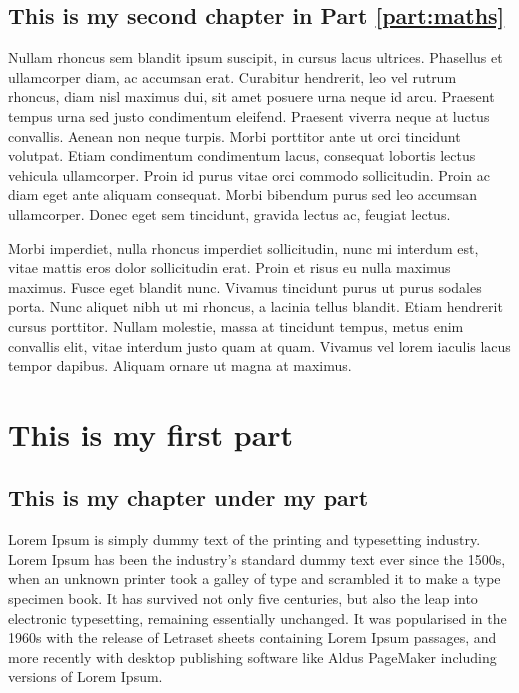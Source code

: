 \documentclass[oneside, a4paper]{book}
\begin{document}
\chapter{This is my second chapter in Part \ref{part:maths}}

 Nullam rhoncus sem blandit ipsum suscipit, in cursus lacus ultrices. Phasellus et ullamcorper diam, ac accumsan erat. Curabitur hendrerit, leo vel rutrum rhoncus, diam nisl maximus dui, sit amet posuere urna neque id arcu. Praesent tempus urna sed justo condimentum eleifend. Praesent viverra neque at luctus convallis. Aenean non neque turpis. Morbi porttitor ante ut orci tincidunt volutpat. Etiam condimentum condimentum lacus, consequat lobortis lectus vehicula ullamcorper. Proin id purus vitae orci commodo sollicitudin. Proin ac diam eget ante aliquam consequat. Morbi bibendum purus sed leo accumsan ullamcorper. Donec eget sem tincidunt, gravida lectus ac, feugiat lectus.

Morbi imperdiet, nulla rhoncus imperdiet sollicitudin, nunc mi interdum est, vitae mattis eros dolor sollicitudin erat. Proin et risus eu nulla maximus maximus. Fusce eget blandit nunc. Vivamus tincidunt purus ut purus sodales porta. Nunc aliquet nibh ut mi rhoncus, a lacinia tellus blandit. Etiam hendrerit cursus porttitor. Nullam molestie, massa at tincidunt tempus, metus enim convallis elit, vitae interdum justo quam at quam. Vivamus vel lorem iaculis lacus tempor dapibus. Aliquam ornare ut magna at maximus. 


\setcounter{chapter}{0}
\part{This is my first part}\label{part:ct}

\chapter{This is my chapter under my part \ref{part:ct}}


\thechapter 
Lorem Ipsum is simply dummy text of the printing and typesetting industry. Lorem Ipsum has been the industry's standard dummy text ever since the 1500s, when an unknown printer took a galley of type and scrambled it to make a type specimen book. It has survived not only five centuries, but also the leap into electronic typesetting, remaining essentially unchanged. It was popularised in the 1960s with the release of Letraset sheets containing Lorem Ipsum passages, and more recently with desktop publishing software like Aldus PageMaker including versions of Lorem Ipsum.
\end{document}
